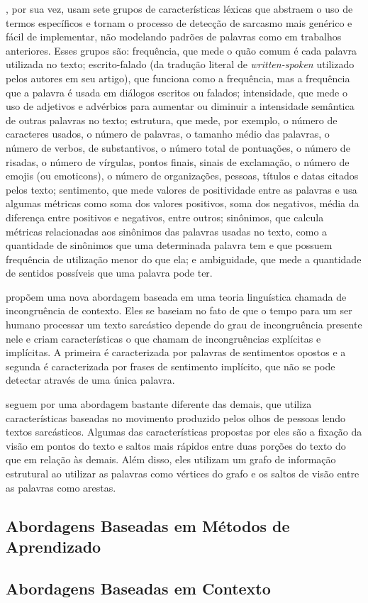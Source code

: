 \cite{barbieri:2014:modelling-sarcasm}, por sua vez, usam sete grupos de
características léxicas que abstraem o uso de termos específicos e tornam o
processo de detecção de sarcasmo mais genérico e fácil de implementar, não
modelando padrões de palavras como em trabalhos anteriores. Esses grupos são:
frequência, que mede o quão comum é cada palavra utilizada no texto;
escrito-falado (da tradução literal de \textit{written-spoken} utilizado pelos
autores em seu artigo), que funciona como a frequência, mas a frequência que a
palavra é usada em diálogos escritos ou falados; intensidade, que mede o uso de
adjetivos e advérbios para aumentar ou diminuir a intensidade semântica de
outras palavras no texto; estrutura, que mede, por exemplo, o número de
caracteres usados, o número de palavras, o tamanho médio das palavras, o número
de verbos, de substantivos, o número total de pontuações, o número de risadas, o
número de vírgulas, pontos finais, sinais de exclamação, o número de emojis (ou
emoticons), o número de organizações, pessoas, títulos e datas citados pelos
texto; sentimento, que mede valores de positividade entre as palavras e usa
algumas métricas como soma dos valores positivos, soma dos negativos, média da
diferença entre positivos e negativos, entre outros; sinônimos, que calcula
métricas relacionadas aos sinônimos das palavras usadas no texto, como a
quantidade de sinônimos que uma determinada palavra tem e que possuem frequência
de utilização menor do que ela; e ambiguidade, que mede a quantidade de sentidos
possíveis que uma palavra pode ter.

\cite{joshi:2015:context-incongruity} propõem uma nova abordagem baseada em uma
teoria linguística chamada de incongruência de contexto. Eles se baseiam no fato
de que o tempo para um ser humano processar um texto sarcástico depende do grau
de incongruência presente nele e criam características o que chamam de
incongruências explícitas e implícitas. A primeira é caracterizada por palavras
de sentimentos opostos e a segunda é caracterizada por frases de sentimento
implícito, que não se pode detectar através de uma única palavra.

\cite{mishra:2016:harnessing-cognitive} seguem por uma abordagem bastante
diferente das demais, que utiliza características baseadas no movimento
produzido pelos olhos de pessoas lendo textos sarcásticos. Algumas das
características propostas por eles são a fixação da visão em pontos do texto e
saltos mais rápidos entre duas porções do texto do que em relação às demais.
Além disso, eles utilizam um grafo de informação estrutural ao utilizar as
palavras como vértices do grafo e os saltos de visão entre as palavras como
arestas.

\subsection{Abordagens Baseadas em Métodos de Aprendizado}%
\label{sub:abordagens_baseadas_em_metodos_de_aprendizado}



\subsection{Abordagens Baseadas em Contexto}%
\label{sub:abordagens_baseadas_em_contexto}




